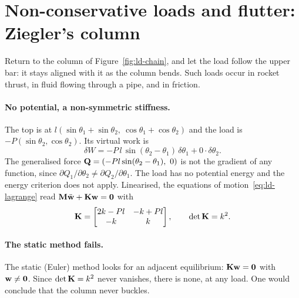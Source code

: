 
\section{Non-conservative loads and flutter: Ziegler's column}\label{sec:ld-flutter}
%

Return to the column of Figure~\ref{fig:ld-chain}, and let the load follow the
upper bar: it stays aligned with it as the column bends. Such loads occur in
rocket thrust, in fluid flowing through a pipe, and in friction.

\paragraph{No potential, a non-symmetric stiffness.}
The top is at $l(\sin\theta_1 + \sin\theta_2,\ \cos\theta_1 + \cos\theta_2)$ and the
load is $-P(\sin\theta_2, \cos\theta_2)$. Its virtual work is
\begin{equation}\label{eq:ld-follower-work}
  \delta W = -P\,l\,\sin(\theta_2 - \theta_1)\,\delta\theta_1 + 0\cdot\delta\theta_2 .
\end{equation}
The generalised force $\mathbf{Q} = (-Pl\sin(\theta_2 - \theta_1),\ 0)$ is not the gradient of
any function, since $\partial Q_1/\partial\theta_2 \neq \partial Q_2/\partial\theta_1$.
The load has no potential energy and the energy criterion does not apply. Linearised,
the equations of motion~\eqref{eq:ld-lagrange} read
$\mathbf{M}\ddot{\mathbf{w}} + \mathbf{K}\mathbf{w} = \mathbf{0}$ with
\begin{equation}\label{eq:ld-ziegler-K}
  \mathbf{K} = \begin{bmatrix} 2k - Pl & -k + Pl \\ -k & k \end{bmatrix} ,
  \qquad \det\mathbf{K} = k^2 .
\end{equation}

\paragraph{The static method fails.}
The static (Euler) method looks for an adjacent equilibrium:
$\mathbf{K}\mathbf{w} = \mathbf{0}$ with $\mathbf{w} \neq \mathbf{0}$. Since $\det\mathbf{K} = k^2$ never
vanishes, there is none, at any load. One would conclude that the column never buckles.


